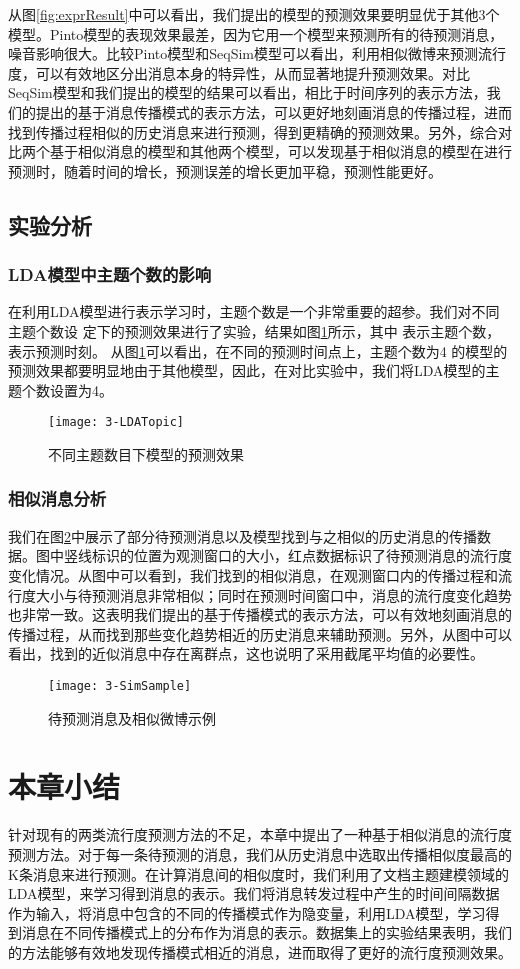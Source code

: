 从图\ref{fig:exprResult}中可以看出，我们提出的模型的预测效果要明显优于其他3个模型。Pinto模型的表现效果最差，因为它用一个模型来预测所有的待预测消息，噪音影响很大。比较Pinto模型和SeqSim模型可以看出，利用相似微博来预测流行度，可以有效地区分出消息本身的特异性，从而显著地提升预测效果。对比SeqSim模型和我们提出的模型的结果可以看出，相比于时间序列的表示方法，我们的提出的基于消息传播模式的表示方法，可以更好地刻画消息的传播过程，进而找到传播过程相似的历史消息来进行预测，得到更精确的预测效果。另外，综合对比两个基于相似消息的模型和其他两个模型，可以发现基于相似消息的模型在进行预测时，随着时间的增长，预测误差的增长更加平稳，预测性能更好。
\subsection{实验分析}
\subsubsection{LDA模型中主题个数的影响}
在利用LDA模型进行表示学习时，主题个数是一个非常重要的超参。我们对不同主题个数设
定下的预测效果进行了实验，结果如图\ref{fig:ldaTopic}所示，其中 表示主题个数， 表示预测时刻。
从图\ref{fig:ldaTopic}可以看出，在不同的预测时间点上，主题个数为4 的模型的预测效果都要明显地由于其他模型，因此，在对比实验中，我们将LDA模型的主题个数设置为4。
\begin{figure}[!htbp]
  \centering
  \texttt{[image: 3-LDATopic]}
  \caption{不同主题数目下模型的预测效果}
  \label{fig:ldaTopic}
\end{figure}

\subsubsection{相似消息分析}
我们在图\ref{fig:simExample}中展示了部分待预测消息以及模型找到与之相似的历史消息的传播数据。图中竖线标识的位置为观测窗口的大小，红点数据标识了待预测消息的流行度变化情况。从图中可以看到，我们找到的相似消息，在观测窗口内的传播过程和流行度大小与待预测消息非常相似；同时在预测时间窗口中，消息的流行度变化趋势也非常一致。这表明我们提出的基于传播模式的表示方法，可以有效地刻画消息的传播过程，从而找到那些变化趋势相近的历史消息来辅助预测。另外，从图中可以看出，找到的近似消息中存在离群点，这也说明了采用截尾平均值的必要性。
\begin{figure}[!htbp]
  \centering
  \texttt{[image: 3-SimSample]}
  \caption{待预测消息及相似微博示例}
  \label{fig:simExample}
\end{figure}

\section{本章小结}
针对现有的两类流行度预测方法的不足，本章中提出了一种基于相似消息的流行度预测方法。对于每一条待预测的消息，我们从历史消息中选取出传播相似度最高的K条消息来进行预测。在计算消息间的相似度时，我们利用了文档主题建模领域的LDA模型，来学习得到消息的表示。我们将消息转发过程中产生的时间间隔数据作为输入，将消息中包含的不同的传播模式作为隐变量，利用LDA模型，学习得到消息在不同传播模式上的分布作为消息的表示。数据集上的实验结果表明，我们的方法能够有效地发现传播模式相近的消息，进而取得了更好的流行度预测效果。
